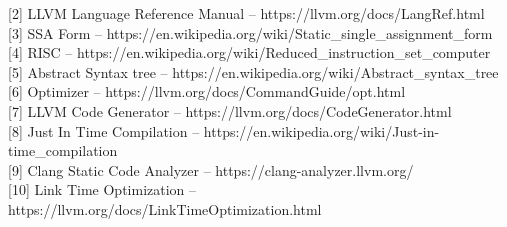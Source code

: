 \documentclass[12pt,oneside]{memoir}
\begin{document}
[2] LLVM Language Reference Manual -- https://llvm.org/docs/LangRef.html \\

[3] SSA Form -- https://en.wikipedia.org/wiki/Static{\_}single{\_}assignment{\_}form \\
 
[4] RISC -- https://en.wikipedia.org/wiki/Reduced{\_}instruction{\_}set{\_}computer \\

[5] Abstract Syntax tree -- https://en.wikipedia.org/wiki/Abstract{\_}syntax{\_}tree \\

[6] Optimizer -- https://llvm.org/docs/CommandGuide/opt.html \\

[7] LLVM Code Generator -- https://llvm.org/docs/CodeGenerator.html \\

[8] Just In Time Compilation  -- https://en.wikipedia.org/wiki/Just-in-time{\_}compilation \\

[9] Clang Static Code Analyzer  -- https://clang-analyzer.llvm.org/ \\ 

[10] Link Time Optimization -- https://llvm.org/docs/LinkTimeOptimization.html
\end{document}
